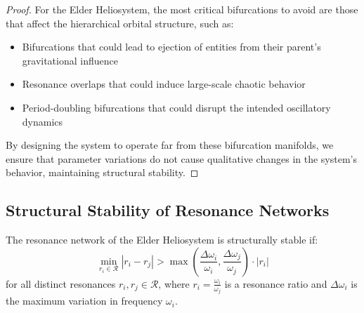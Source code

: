 \begin{proof}
For the Elder Heliosystem, the most critical bifurcations to avoid are those that affect the hierarchical orbital structure, such as:
\begin{itemize}
    \item Bifurcations that could lead to ejection of entities from their parent's gravitational influence
    \item Resonance overlaps that could induce large-scale chaotic behavior
    \item Period-doubling bifurcations that could disrupt the intended oscillatory dynamics
\end{itemize}

By designing the system to operate far from these bifurcation manifolds, we ensure that parameter variations do not cause qualitative changes in the system's behavior, maintaining structural stability.
\end{proof}

\subsection{Structural Stability of Resonance Networks}

\begin{theorem}
The resonance network of the Elder Heliosystem is structurally stable if:
\begin{equation}
\min_{r_i \in \mathcal{R}} |r_i - r_j| > \max\left(\frac{\Delta \omega_i}{\omega_i}, \frac{\Delta \omega_j}{\omega_j}\right) \cdot |r_i|
\end{equation}
for all distinct resonances $r_i, r_j \in \mathcal{R}$, where $r_i = \frac{\omega_i}{\omega_j}$ is a resonance ratio and $\Delta \omega_i$ is the maximum variation in frequency $\omega_i$.
\end{theorem}

